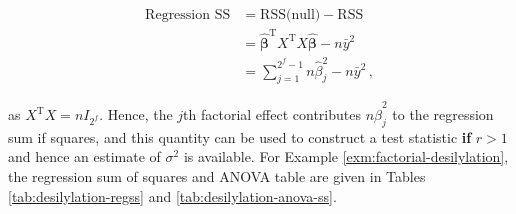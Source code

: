 \documentclass[
]{book}
\newenvironment{Shaded}{\begin{snugshade}}{\end{snugshade}}
\newcommand{\AttributeTok}[1]{\textcolor[rgb]{0.77,0.63,0.00}{#1}}
\newcommand{\DecValTok}[1]{\textcolor[rgb]{0.00,0.00,0.81}{#1}}
\newcommand{\FunctionTok}[1]{\textcolor[rgb]{0.00,0.00,0.00}{#1}}
\newcommand{\NormalTok}[1]{#1}
\newcommand{\OtherTok}[1]{\textcolor[rgb]{0.56,0.35,0.01}{#1}}
\newcommand{\SpecialCharTok}[1]{\textcolor[rgb]{0.00,0.00,0.00}{#1}}
\newcommand{\StringTok}[1]{\textcolor[rgb]{0.31,0.60,0.02}{#1}}
\theoremstyle{definition}
\theoremstyle{definition}
\theoremstyle{definition}
\theoremstyle{definition}
\theoremstyle{remark}
\begin{document}
\begin{align*}
\mbox{Regression SS} & = \mbox{RSS(null)} - \mbox{RSS} \\
& = \hat{\boldsymbol{\beta}}^{\mathrm{T}}X^{\mathrm{T}}X\hat{\boldsymbol{\beta}} - n\bar{y}^2 \\
& = \sum_{j=1}^{2^f-1}n\hat{\beta}_j^2 - n\bar{y}^2\,,
\end{align*}

as \(X^{\mathrm{T}}X = nI_{2^f}\). Hence, the \(j\)th factorial effect contributes \(n\hat{\beta}_j^2\) to the regression sum if squares, and this quantity can be used to construct a test statistic \textbf{if} \(r>1\) and hence an estimate of \(\sigma^2\) is available. For Example \ref{exm:factorial-desilylation}, the regression sum of squares and ANOVA table are given in Tables \ref{tab:desilylation-regss} and \ref{tab:desilylation-anova-ss}.

\begin{Shaded}
\end{Shaded}
\end{document}
